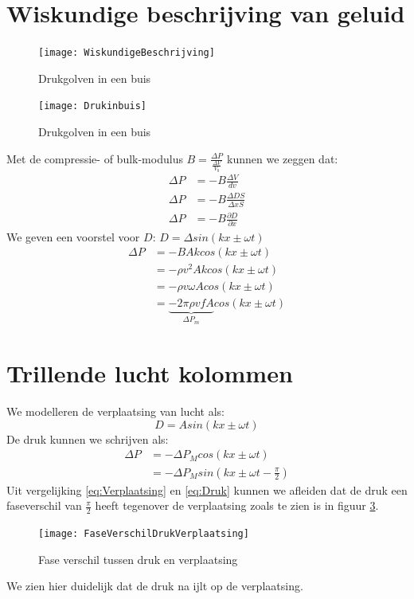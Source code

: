 \documentclass[a4paper,kul]{kulakarticle} %
\begin{document}
\section{Wiskundige beschrijving van geluid}
\begin{figure}[h]
	\centering
	\texttt{[image: WiskundigeBeschrijving]}
	\caption[Drukgolven]{Drukgolven in een buis}
	\label{fig:drukgolvenbuis}
\end{figure}
\begin{figure}[h]
	\centering
	\texttt{[image: Drukinbuis]}
	\caption[Drukgolven]{Drukgolven in een buis}
	\label{fig:drukgolvenbuisgrafiek}
\end{figure}
Met de compressie- of bulk-modulus $B = \frac{\Delta P}{\frac{\Delta V}{V_0}}$ kunnen we zeggen dat:
\begin{align*}
	\Delta P &= -B \frac{\Delta V}{dv}\\
	\Delta P &= -B \frac{\Delta DS}{\Delta xS}\\
	\Delta P &= -B \frac{\partial D}{\partial x}
\end{align*}
We geven een voorstel voor $D$: $D = \Delta sin(kx\pm \omega t)$
\begin{align*}
	\Delta P &= -BAkcos(kx\pm \omega t)\\
	&= -\rho v^2Akcos(kx\pm \omega t)\\
	&= -\rho v\omega Acos(kx\pm \omega t)\\
	&= \underbrace{-2\pi\rho vfA}_{\Delta P_m} cos(kx\pm \omega t)
\end{align*}
\newpage
\section{Trillende lucht kolommen}
We modelleren de verplaatsing van lucht als:
\begin{equation}
	\label{eq:Verplaatsing}
	D = Asin(kx\pm\omega t)
\end{equation}
De druk kunnen we schrijven als:
\begin{align}
	\Delta P &= -\Delta P_M cos(kx\pm\omega t)\\
	\label{eq:Druk}
	&= -\Delta P_M sin(kx\pm\omega t-\frac{\pi}{2})
\end{align}
Uit vergelijking \ref{eq:Verplaatsing} en \ref{eq:Druk} kunnen we afleiden dat de druk een faseverschil van $\frac{\pi}{2}$ heeft tegenover de verplaatsing zoals te zien is in figuur \ref{fig:faseverschildrukverplaatsing}. 
\begin{figure}[h]
	\centering
	\texttt{[image: FaseVerschilDrukVerplaatsing]}
	\caption[Fase vershil druk verplaatsing]{Fase verschil tussen druk en verplaatsing}
	\label{fig:faseverschildrukverplaatsing}
\end{figure}
We zien hier duidelijk dat de druk na ijlt op de verplaatsing. 
\newpage
\end{document}
